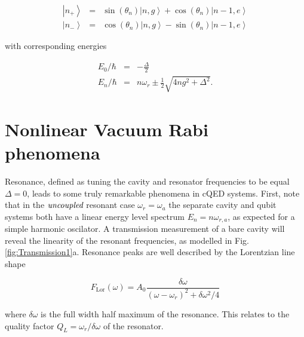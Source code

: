 \documentclass[11 pt, oneside]{book} %
\newcommand{\ket}[1]{\left| #1 \right>} %
\begin{document}
\begin{eqnarray}
\ket{n_+} &=& \sin(\theta_n)\ket{n,g}+\cos(\theta_n)\ket{n-1,e} \\
\ket{n_-} &=& \cos(\theta_n)\ket{n,g}-\sin(\theta_n)\ket{n-1,e}
\end{eqnarray}

with corresponding energies

\begin{eqnarray}
E_0/\hbar &=& -\frac{\Delta}{2} \\
E_n/\hbar &=& n\omega_r \pm \frac{1}{2}\sqrt{4ng^2+\Delta^2} .\nonumber
\end{eqnarray}


\section{Nonlinear Vacuum Rabi phenomena}\label{sec:Rabi}
Resonance, defined as tuning the cavity and resonator frequencies to be equal $\Delta=0$, leads to some truly remarkable phenomena in cQED systems. First, note that in the $\emph{uncoupled}$ resonant case $\omega_r=\omega_a$ the separate cavity and qubit systems both have a linear energy level spectrum $E_n=n\omega_{r,a}$, as expected for a simple harmonic oscilator. A transmission measurement of a bare cavity will reveal the linearity of the resonant frequencies, as modelled in Fig. \ref{fig:Transmission1}a. Resonance peaks are well described by the Lorentzian line shape

\begin{equation}
F_{\mathrm{Lor}}(\omega)=A_0\frac{\delta \omega}{(\omega-\omega_r)^2+\delta \omega^2/4}
\end{equation}

where $\delta \omega$ is the full width half maximum of the resonance. This relates to the quality factor $Q_L=\omega_r/\delta\omega$ of the resonator. 
\end{document}
